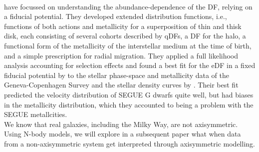 \\\citet{2015MNRAS.449.3479S} have focussed on understanding the abundance-dependence of the DF, relying on a fiducial potential. They developed extended distribution functions, i.e., functions of both actions and metallicity for a superposition of thin and thisk disk, each consisting of several cohorts described by qDFs, a DF for the halo, a functional form of the metallicity of the interstellar medium at the time of birth, and a simple prescription for radial migration. They applied a full likelihood analysis accounting for selection effects and found a best fit for the eDF in a fixed fiducial potential by \citet{1998MNRAS.294..429D} to the stellar phase-space and metallicity \Wilma{[TO DO: CHECK]} data of the Geneva-Copenhagen Survey \citep{2004A&A...418..989N,2009A&A...501..941H} and the stellar density curves by \citet{1983MNRAS.202.1025G}. Their best fit predicted the velocity distribution of SEGUE G dwarfs quite well, but had biases in the metallicity distribution, which they accounted to being a problem with the SEGUE metallcities. \\


We know that real galaxies, including the Milky Way, are not axisymmetric. Using N-body models, we will explore in a subsequent paper what when data from a non-axisymmetric system get interpreted through axisymmetric modelling.

